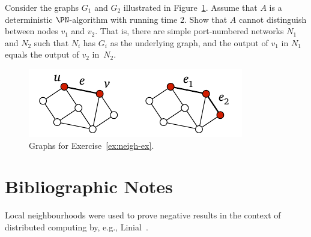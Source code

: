 \begin{ex}\label{ex:neigh-ex}
    Consider the graphs $G_1$ and $G_2$ illustrated in Figure~\ref{fig:neigh-ex}. Assume that $A$ is a deterministic $\PN$-algorithm with running time $2$. Show that $A$ cannot distinguish between nodes $v_1$ and $v_2$. That is, there are simple port-numbered networks $N_1$ and $N_2$ such that $N_i$ has $G_i$ as the underlying graph, and the output of $v_1$ in $N_1$ equals the output of $v_2$ in~$N_2$.


    \begin{figure}
        \centering
        \includegraphics[page=\PNeighEx]{figs.pdf}
        \caption{Graphs for Exercise~\ref{ex:neigh-ex}.}\label{fig:neigh-ex}
    \end{figure}
\end{ex}


\section{Bibliographic Notes}

Local neighbourhoods were used to prove negative results in the context of distributed computing by, e.g., Linial~\cite{linial92locality}.
